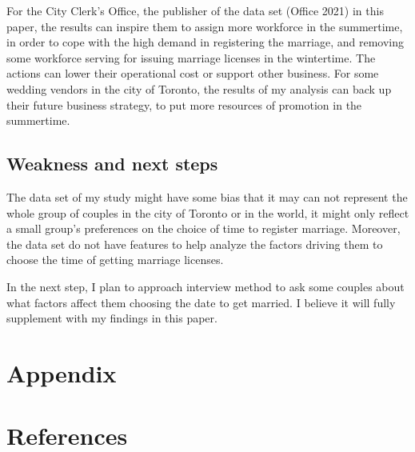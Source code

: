 \documentclass[
]{article}
\begin{document}
For the City Clerk's Office, the publisher of the data set (Office 2021) in this paper, the results can inspire them to assign more workforce in the summertime, in order to cope with the high demand in registering the marriage, and removing some workforce serving for issuing marriage licenses in the wintertime. The actions can lower their operational cost or support other business. For some wedding vendors in the city of Toronto, the results of my analysis can back up their future business strategy, to put more resources of promotion in the summertime.

\hypertarget{weakness-and-next-steps}{%
\subsection{Weakness and next steps}\label{weakness-and-next-steps}}

The data set of my study might have some bias that it may can not represent the whole group of couples in the city of Toronto or in the world, it might only reflect a small group's preferences on the choice of time to register marriage. Moreover, the data set do not have features to help analyze the factors driving them to choose the time of getting marriage licenses.

In the next step, I plan to approach interview method to ask some couples about what factors affect them choosing the date to get married. I believe it will fully supplement with my findings in this paper.

\newpage

\hypertarget{appendix}{%
\section*{Appendix}\label{appendix}}

\newpage

\hypertarget{references}{%
\section*{References}\label{references}}
\end{document}
